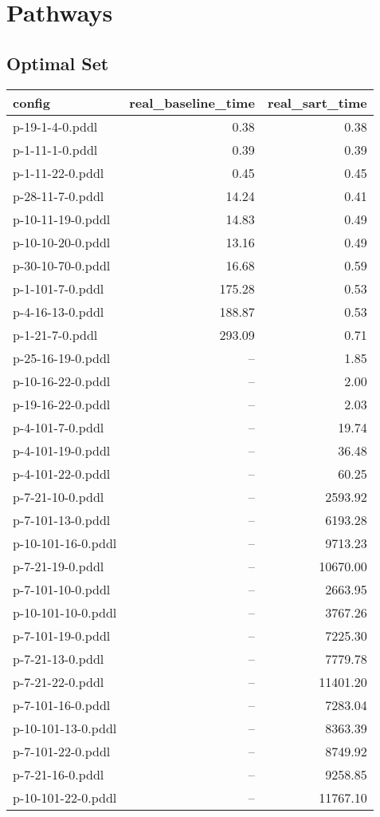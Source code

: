 \documentclass{article}
\begin{document}
                \newpage \section{Pathways}
                    \subsection*{Optimal Set}
                    
                            \begin{center}
                            \scriptsize
                            \begin{tabular}{@{}l|r|r@{}}
                            config & real\_baseline\_time & real\_sart\_time\\\midrule
                             p-19-1-4-0.pddl&0.38&0.38\\
 p-1-11-1-0.pddl&0.39&0.39\\
 p-1-11-22-0.pddl&0.45&0.45\\
 p-28-11-7-0.pddl&14.24&0.41\\
 p-10-11-19-0.pddl&14.83&0.49\\
 p-10-10-20-0.pddl&13.16&0.49\\
 p-30-10-70-0.pddl&16.68&0.59\\
 p-1-101-7-0.pddl&175.28&0.53\\
 p-4-16-13-0.pddl&188.87&0.53\\
 p-1-21-7-0.pddl&293.09&0.71\\
 p-25-16-19-0.pddl&--&1.85\\
 p-10-16-22-0.pddl&--&2.00\\
 p-19-16-22-0.pddl&--&2.03\\
 p-4-101-7-0.pddl&--&19.74\\
 p-4-101-19-0.pddl&--&36.48\\
 p-4-101-22-0.pddl&--&60.25\\
 p-7-21-10-0.pddl&--&2593.92\\
 p-7-101-13-0.pddl&--&6193.28\\
 p-10-101-16-0.pddl&--&9713.23\\
 p-7-21-19-0.pddl&--&10670.00\\
 p-7-101-10-0.pddl&--&2663.95\\
 p-10-101-10-0.pddl&--&3767.26\\
 p-7-101-19-0.pddl&--&7225.30\\
 p-7-21-13-0.pddl&--&7779.78\\
 p-7-21-22-0.pddl&--&11401.20\\
 p-7-101-16-0.pddl&--&7283.04\\
 p-10-101-13-0.pddl&--&8363.39\\
 p-7-101-22-0.pddl&--&8749.92\\
 p-7-21-16-0.pddl&--&9258.85\\
 p-10-101-22-0.pddl&--&11767.10
                            \end{tabular}
                            \end{center}
                    
\end{document}
